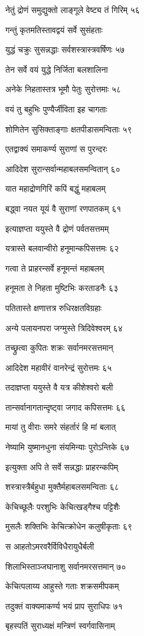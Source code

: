 नेतुं द्रोणं समुद्युक्तो लाङ्गूले वेष्ट्य तं गिरिम् ५६

गन्तुं कृतमतिस्तावद्वयं सर्वे सुसंहताः

युद्धं चक्रुः सुसन्नद्धाः सर्वशस्त्रास्त्रवर्षिणः ५७

तेन सर्वे वयं युद्धे निर्जिता बलशालिना

अनेके निहतास्तत्र भूमौ पेतुः सुरोत्तमाः ५८

वयं तु बहुभिः पुण्यैर्जीविता इह चागताः

शोणितेन सुसिक्ताङ्गाः क्षतपीडासमन्विताः ५९

एतद्वाक्यं समाकर्ण्य सुराणां स पुरन्दरः

आदिदेश सुरान्सर्वान्महाबलसमन्वितान् ६०

यात महाद्रोणगिरिं कपिं बद्धुं महाबलम्

बद्ध्वा नयत यूयं वै सुराणां रणपातकम् ६१

इत्याज्ञप्ता ययुस्ते वै द्रोणं पर्वतसत्तमम्

यत्रास्ते बलवान्वीरो हनूमान्कपिसत्तमः ६२

गत्वा ते प्राहरन्सर्वे हनूमन्तं महाबलम्

हनूमता ते निहता मुष्टिभिः करताडनैः ६३

पतितास्ते क्षणात्तत्र रुधिरक्षतविग्रहाः

अन्ये पलायनपरा जग्मुस्ते त्रिदिवेश्वरम् ६४

तच्छ्रुत्वा कुपितः शक्रः सर्वानमरसत्तमान्

आदिदेश महावीरं वानरेन्द्रं सुरोत्तमः ६५

तदाज्ञप्ता ययुस्ते वै यत्र कीशेश्वरो बली

तान्सर्वानागतान्दृष्ट्वा जगाद कपिसत्तमः ६६

मायां तु वीराः समरे संहर्तारं हि मां बलात्

नेष्यामि युष्मानधुना संयमिन्याः पुरोऽन्तिके ६७

इत्युक्ता अपि ते सर्वे सन्नद्धाः प्राहरन्कपिम्

शस्त्रास्त्रैर्बहुधा मुक्तैर्महाबलसमन्विताः ६८

केचिच्छूलैः परशुभिः केचित्खड्गैश्च पट्टिशैः

मुसलैः शक्तिभिः केचित्क्रोधेन कलुषीकृताः ६९

स आहतोऽमरवरैर्विविधैरायुधैर्बली

शिलाभिस्ताञ्जघानाशु सर्वानमरसत्तमान् ७०

केचित्पलाय्य आहुस्ते गताः शक्रसमीपकम्

तदुक्तं वाक्यमाकर्ण्य भयं प्राप सुराधिपः ७१

बृहस्पतिं सुराध्यक्षं मन्त्रिणं स्वर्गवासिनाम्

